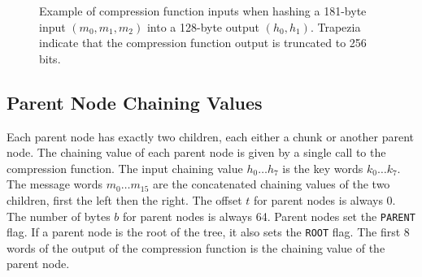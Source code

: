 \documentclass[11pt,notitlepage,a4paper]{article}
\begin{document}
\begin{figure}
\caption{Example of compression function inputs when hashing a 181-byte input $(m_0, m_1, m_2)$ into a 128-byte output $(h_0, h_1)$. Trapezia indicate that the compression function output is truncated to 256 bits.}\label{fig:chunk}
\end{figure}

\subsection{Parent Node Chaining Values}\label{sec:parent}

Each parent node has exactly two children, each either a chunk or another
parent node. The chaining value of each parent node is given by a single call
to the compression function. The input chaining value $h_{0} \ldots h_{7}$ is
the key words $k_{0} \ldots k_{7}$. The message words $m_{0} \ldots m_{15}$ are
the concatenated chaining values of the two children, first the left then the
right. The offset $t$ for parent nodes is always 0. The number of bytes $b$ for
parent nodes is always 64. Parent nodes set the \texttt{PARENT} flag. If a
parent node is the root of the tree, it also sets the \texttt{ROOT} flag. The
first 8 words of the output of the compression function is the chaining value
of the parent node.
\end{document}
